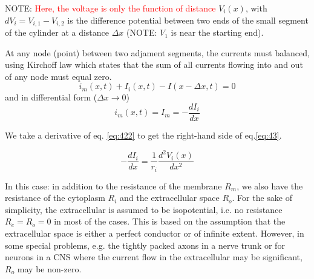 NOTE: \textcolor{red}{Here, the voltage is only the function of distance}
$V_i(x)$, 
with $d  V_i = V_{i,1}-V_{i,2}$ is 
the difference potential between two
ends of the small segment of the cylinder at a distance $\Delta x$ 
(NOTE: $V_1$ is near the starting end). 

At any node (point) between two adjament segments, the currents must balanced,
using Kirchoff law which states that the sum of all currents flowing into and
out of any node must equal zero.
\begin{equation}
i_m(x,t) + I_i(x,t) - I (x-\Delta x, t) = 0
\end{equation}
and in differential form ($\Delta x \rightarrow 0$)
\begin{equation}
  \label{eq:43}
  i_m(x,t) = I_m =   -\frac{dI_i}{dx} 
\end{equation}

We take a derivative of eq. \ref{eq:422} to get the right-hand side of
eq.\ref{eq:43}.

\begin{equation}
  \label{eq:dIidx}
  -\frac{dI_i}{dx} =  \frac{1}{r_i}\frac{d ^2V_i(x)}{d x^2}
\end{equation} 


\begin{mdframed}

In this case: in addition to the resistance of the membrane $R_m$, we also have
the resistance of the cytoplasm $R_i$ and the extracellular space $R_o$. For the
sake of simplicity, the extracellular is assumed to be isopotential, i.e. no
resistance $R_e=R_o=0$ in most of the cases. This is based on the assumption
that the extracellular space is either a perfect conductor or of infinite
extent.
However, in some special problems, e.g. the tightly packed axons in a nerve
trunk or for neurons in a CNS where the current flow in the extracellular may be
significant, $R_o$ may be non-zero.
\end{mdframed}

